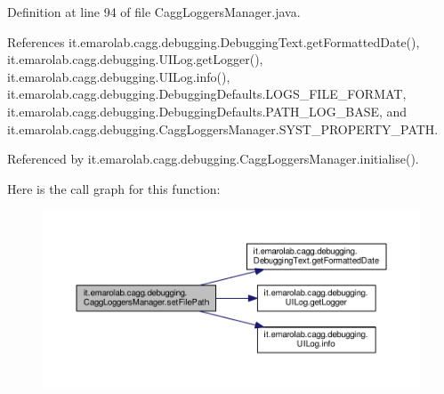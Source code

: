 Definition at line 94 of file Cagg\-Loggers\-Manager.\-java.



References it.\-emarolab.\-cagg.\-debugging.\-Debugging\-Text.\-get\-Formatted\-Date(), it.\-emarolab.\-cagg.\-debugging.\-U\-I\-Log.\-get\-Logger(), it.\-emarolab.\-cagg.\-debugging.\-U\-I\-Log.\-info(), it.\-emarolab.\-cagg.\-debugging.\-Debugging\-Defaults.\-L\-O\-G\-S\-\_\-\-F\-I\-L\-E\-\_\-\-F\-O\-R\-M\-A\-T, it.\-emarolab.\-cagg.\-debugging.\-Debugging\-Defaults.\-P\-A\-T\-H\-\_\-\-L\-O\-G\-\_\-\-B\-A\-S\-E, and it.\-emarolab.\-cagg.\-debugging.\-Cagg\-Loggers\-Manager.\-S\-Y\-S\-T\-\_\-\-P\-R\-O\-P\-E\-R\-T\-Y\-\_\-\-P\-A\-T\-H.



Referenced by it.\-emarolab.\-cagg.\-debugging.\-Cagg\-Loggers\-Manager.\-initialise().



Here is the call graph for this function\-:\nopagebreak
\begin{figure}[H]
\begin{center}
\leavevmode
\includegraphics[width=350pt]{classit_1_1emarolab_1_1cagg_1_1debugging_1_1CaggLoggersManager_a76d643f5dd354a9c58046479e24bb83b_cgraph}
\end{center}
\end{figure}




